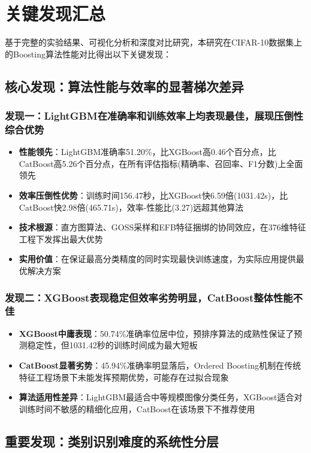 \documentclass[UTF8]{report}
\theoremstyle{MyLineTheoremStyle} %
\theoremstyle{MyBlockTheoremStyle} %
\theoremstyle{MySubsubsectionStyle} %
\begin{document}
\section{关键发现汇总}
基于完整的实验结果、可视化分析和深度对比研究，本研究在CIFAR-10数据集上的Boosting算法性能对比得出以下关键发现：

\subsection{核心发现：算法性能与效率的显著梯次差异}
\subsubsection{发现一：LightGBM在准确率和训练效率上均表现最佳，展现压倒性综合优势}
\begin{itemize}
    \item \textbf{性能领先}：LightGBM准确率51.20\%，比XGBoost高0.46个百分点，比CatBoost高5.26个百分点，在所有评估指标(精确率、召回率、F1分数)上全面领先
    \item \textbf{效率压倒性优势}：训练时间156.47秒，比XGBoost快6.59倍(1031.42s)，比CatBoost快2.98倍(465.71s)，效率-性能比(3.27)远超其他算法
    \item \textbf{技术根源}：直方图算法、GOSS采样和EFB特征捆绑的协同效应，在376维特征工程下发挥出最大优势
    \item \textbf{实用价值}：在保证最高分类精度的同时实现最快训练速度，为实际应用提供最优解决方案
\end{itemize}

\subsubsection{发现二：XGBoost表现稳定但效率劣势明显，CatBoost整体性能不佳}
\begin{itemize}
    \item \textbf{XGBoost中庸表现}：50.74\%准确率位居中位，预排序算法的成熟性保证了预测稳定性，但1031.42秒的训练时间成为最大短板
    \item \textbf{CatBoost显著劣势}：45.94\%准确率明显落后，Ordered Boosting机制在传统特征工程场景下未能发挥预期优势，可能存在过拟合现象
    \item \textbf{算法适用性差异}：LightGBM最适合中等规模图像分类任务，XGBoost适合对训练时间不敏感的精细化应用，CatBoost在该场景下不推荐使用
\end{itemize}

\subsection{重要发现：类别识别难度的系统性分层}
\end{document}
